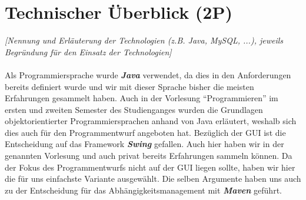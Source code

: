 \section{Technischer Überblick (2P)}
\emph{[Nennung und Erläuterung der Technologien (z.B. Java, MySQL, ...), jeweils Begründung für den
Einsatz der Technologien]}
\\
\\
\noindent Als Programmiersprache wurde \textbf{\emph{Java}} verwendet, da dies in den Anforderungen bereits definiert wurde und wir mit dieser Sprache bisher die meisten Erfahrungen gesammelt haben. Auch in der Vorlesung \enquote{Programmieren} im ersten und zweiten Semester des Studienganges wurden die Grundlagen objektorientierter Programmiersprachen anhand von Java erläutert, weshalb sich dies auch für den Programmentwurf angeboten hat. Bezüglich der \acs{GUI} ist die Entscheidung auf das Framework \textbf{\emph{Swing}} gefallen. Auch hier haben wir in der genannten Vorlesung und auch privat bereits Erfahrungen sammeln können. Da der Fokus des Programmentwurfs nicht auf der \acs{GUI} liegen sollte, haben wir hier die für uns einfachste Variante ausgewählt. Die selben Argumente haben uns auch zu der Entscheidung für das Abhängigkeitsmanagement mit \textbf{\emph{Maven}} geführt.